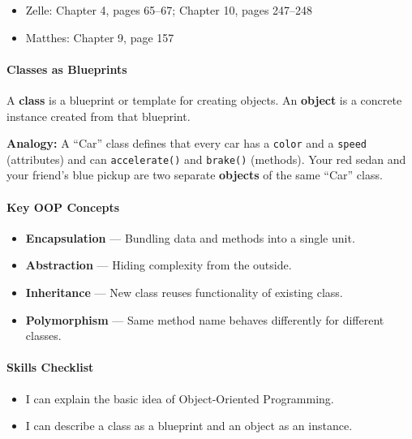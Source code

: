 \documentclass[
  justified,
  openright,
]{tufte-book}
\let\subsection\paragraph
\let\paragraph\paragraph
\let\subsection\paragraph
\let\paragraph\paragraph
\providecommand{\tightlist}{%
  \setlength{\itemsep}{0pt}\setlength{\parskip}{0pt}}
\begin{document}
\begin{itemize}
\tightlist
\item
  Zelle: Chapter 4, pages 65--67; Chapter 10, pages 247--248
\item
  Matthes: Chapter 9, page 157
\end{itemize}

\subsection{Classes as Blueprints}\label{classes-as-blueprints}

A \textbf{class} is a blueprint or template for creating objects. An
\textbf{object} is a concrete instance created from that blueprint.

\textbf{Analogy:} A ``Car'' class defines that every car has a
\texttt{color} and a \texttt{speed} (attributes) and can
\texttt{accelerate()} and \texttt{brake()} (methods). Your red sedan and
your friend's blue pickup are two separate \textbf{objects} of the same
``Car'' class.

\subsection{Key OOP Concepts}\label{key-oop-concepts}

\begin{itemize}
\tightlist
\item
  \textbf{Encapsulation} --- Bundling data and methods into a single
  unit.
\item
  \textbf{Abstraction} --- Hiding complexity from the outside.
\item
  \textbf{Inheritance} --- New class reuses functionality of existing
  class.
\item
  \textbf{Polymorphism} --- Same method name behaves differently for
  different classes.
\end{itemize}

\subsection{Skills Checklist}\label{skills-checklist-32}

\begin{itemize}
\tightlist
\item[$\square$]
  I can explain the basic idea of Object-Oriented Programming.
\item[$\square$]
  I can describe a class as a blueprint and an object as an instance.
\end{itemize}
\end{document}
